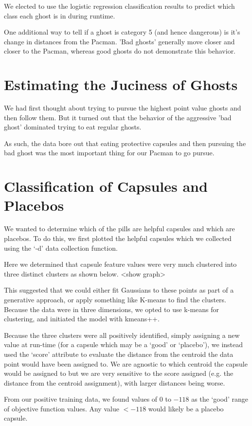 \documentclass[11pt, oneside]{article}   	%
\begin{document}
We elected to use the logistic regression classification results to predict which class each ghost is in during runtime.

One additional way to tell if a ghost is category 5 (and hence dangerous) is it's change in distances from the Pacman. 'Bad ghosts' generally move closer and closer to the Pacman, whereas good ghosts do not demonstrate this behavior.

\section{Estimating the Juciness of Ghosts}

We had first thought about trying to pursue the highest point value ghosts and then follow them. But it turned out that the behavior of the aggressive 'bad ghost' dominated trying to eat regular ghosts.

As such, the data bore out that eating protective capsules and then pursuing the bad ghost was the most important thing for our Pacman to go pursue.

\section{Classification of Capsules and Placebos}
We wanted to determine which of the pills are helpful capsules and which are placebos. To do this, we first plotted the helpful capsules which we collected using the `-d' data collection function.

Here we determined that capsule feature values were very much clustered into three distinct clusters as shown below.
<show graph>

This suggested that we could either fit Gaussians to these points as part of a generative approach, or apply something like K-means to find the clusters. Because the data were in three dimensions, we opted to use k-means for clustering, and initiated the model with kmeans++.

Because the three clusters were all positively identified, simply assigning a new value at run-time (for a capsule which may be a `good' or `placebo'), we instead used the `score' attribute to evaluate the distance from the centroid the data point would have been assigned to. We are agnostic to which centroid the capsule would be assigned to but we are very sensitive to the score assigned (e.g. the distance from the centroid assignment), with larger distances being worse.

From our positive training data, we found values of $0$ to $-118$ as the `good' range of objective function values. Any value $<-118$ would likely be a placebo capsule.
\end{document}
